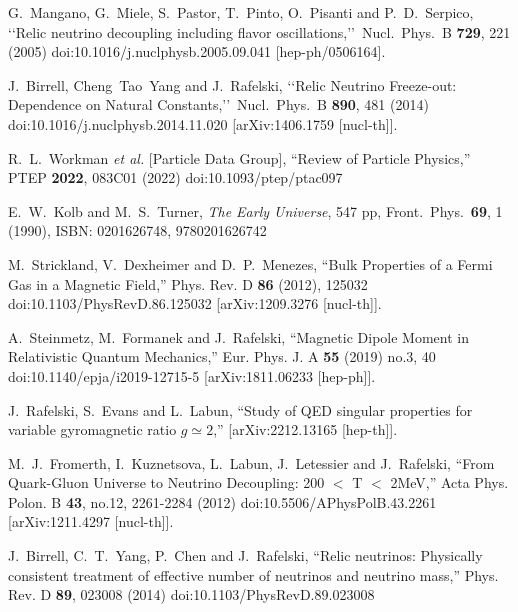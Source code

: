 \documentclass[universe,article,submit,moreauthors,pdftex,a4paper]{Definitions/mdpi}
\begin{document}
\begin{thebibliography}{99}
G.~Mangano, G.~Miele, S.~Pastor, T.~Pinto, O.~Pisanti and P.~D.~Serpico,
\lq\lq Relic neutrino decoupling including flavor oscillations,\rq\rq\
Nucl.\ Phys.\ B {\bf 729}, 221 (2005)
doi:10.1016/j.nuclphysb.2005.09.041
[hep-ph/0506164].

 J.~Birrell, Cheng~Tao~Yang and J.~Rafelski,
\lq\lq Relic Neutrino Freeze-out: Dependence on Natural Constants,\rq\rq\
 Nucl.\ Phys.\ B {\bf 890}, 481 (2014)
 doi:10.1016/j.nuclphysb.2014.11.020
 [arXiv:1406.1759 [nucl-th]].


R.~L.~Workman \textit{et al.} [Particle Data Group],
``Review of Particle Physics,''
PTEP \textbf{2022}, 083C01 (2022)
doi:10.1093/ptep/ptac097

E.~W.~Kolb and M.~S.~Turner,
\emph{The Early Universe},
547 pp, Front.\ Phys.\ {\bf 69}, 1 (1990),
ISBN: 0201626748, 9780201626742

M.~Strickland, V.~Dexheimer and D.~P.~Menezes,
``Bulk Properties of a Fermi Gas in a Magnetic Field,''
Phys. Rev. D \textbf{86} (2012), 125032
doi:10.1103/PhysRevD.86.125032
[arXiv:1209.3276 [nucl-th]].

A.~Steinmetz, M.~Formanek and J.~Rafelski,
``Magnetic Dipole Moment in Relativistic Quantum Mechanics,''
Eur. Phys. J. A \textbf{55} (2019) no.3, 40
doi:10.1140/epja/i2019-12715-5
[arXiv:1811.06233 [hep-ph]].

J.~Rafelski, S.~Evans and L.~Labun,
``Study of QED singular properties for variable gyromagnetic ratio $g\simeq 2$,''
[arXiv:2212.13165 [hep-th]].


M.~J.~Fromerth, I.~Kuznetsova, L.~Labun, J.~Letessier and J.~Rafelski,
``From Quark-Gluon Universe to Neutrino Decoupling: 200 \ensuremath{<} T \ensuremath{<} 2MeV,''
Acta Phys. Polon. B \textbf{43}, no.12, 2261-2284 (2012)
doi:10.5506/APhysPolB.43.2261
[arXiv:1211.4297 [nucl-th]].

J.~Birrell, C.~T.~Yang, P.~Chen and J.~Rafelski,
``Relic neutrinos: Physically consistent treatment of effective number of neutrinos and neutrino mass,''
Phys. Rev. D \textbf{89}, 023008 (2014)
doi:10.1103/PhysRevD.89.023008



\end{thebibliography}
\end{document}
